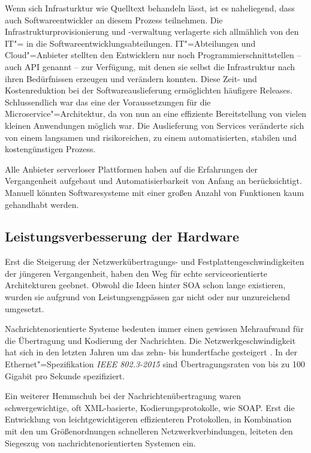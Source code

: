 Wenn sich Infrasturktur wie Quelltext behandeln lässt, ist es naheliegend, dass auch Softwareentwickler an diesem Prozess teilnehmen. Die Infrastrukturprovisionierung und -verwaltung verlagerte sich allmählich von den IT"= in die Softwareentwicklungsabteilungen. IT"=Abteilungen und Cloud"=Anbieter stellten den Entwicklern nur noch Programmierschnittstellen -- auch API genannt -- zur Verfügung, mit denen sie selbst die Infrastruktur nach ihren Bedürfnissen erzeugen und verändern konnten. Diese Zeit- und Kostenreduktion bei der Softwareauslieferung ermöglichten häufigere Releases. Schlussendlich war das eine der Voraussetzungen für die Microservice"=Architektur, da von nun an eine effiziente Bereitstellung von vielen kleinen Anwendungen möglich war. Die Auslieferung von Services veränderte sich von einem langsamen und risikoreichen, zu einem automatisierten, stabilen und kostengünstigen Prozess.

Alle Anbieter serverloser Plattformen haben auf die Erfahrungen der Vergangenheit aufgebaut und Automatisierbarkeit von Anfang an berücksichtigt. Manuell könnten Softwaresysteme mit einer großen Anzahl von Funktionen kaum gehandhabt werden. 

\subsection{Leistungsverbesserung der Hardware}

Erst die Steigerung der Netzwerkübertragungs- und Festplattengeschwindigkeiten der jüngeren Vergangenheit, haben den Weg für echte serviceorientierte Architekturen geebnet. Obwohl die Ideen hinter SOA schon lange existieren, wurden sie aufgrund von Leistungsengpässen gar nicht oder nur unzureichend umgesetzt.

Nachrichtenorientierte Systeme bedeuten immer einen gewissen Mehraufwand für die Übertragung und Kodierung der Nachrichten. Die Netzwerkgeschwindigkeit hat sich in den letzten Jahren um das zehn- bis hundertfache gesteigert \cite{IEEEBandwidth}. In der Ethernet"=Spezifikation \textit{IEEE 802.3-2015} sind Übertragungsraten von bis zu 100 Gigabit pro Sekunde spezifiziert.

Ein weiterer Hemmschuh bei der Nachrichtenübertragung waren schwergewichtige, oft XML-basierte, Kodierungsprotokolle, wie \zB SOAP. Erst die Entwicklung von leichtgewichtigeren \bzw effizienteren Protokollen, in Kombination mit den um Größenordnungen schnelleren Netzwerkverbindungen, leiteten den Siegeszug von nachrichtenorientierten Systemen ein.

